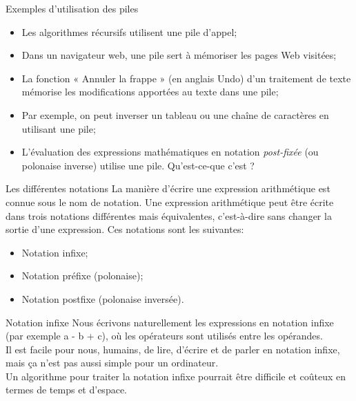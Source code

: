 \documentclass[10pt,xcolor=dvipsnames]{beamer}
\begin{document}
\begin{frame}{Exemples d'utilisation des piles}

\begin{itemize}
    \item  Les algorithmes récursifs utilisent une pile d'appel;
    \item  Dans un navigateur web, une pile sert à mémoriser les pages Web visitées;
    \item     La fonction « Annuler la frappe » (en anglais Undo) d'un traitement de texte mémorise les modifications apportées au texte dans une pile;
    \item Par exemple, on peut inverser un tableau ou une chaîne de caractères en utilisant une pile;
    \item L'évaluation des expressions mathématiques en notation \textit{post-fixée} (ou polonaise inverse) utilise une pile. \alert{Qu'est-ce-que c'est ?}
    
\end{itemize}
\end{frame}

\begin{frame}{Les différentes notations}
    La manière d'écrire une expression arithmétique est connue sous le nom de \alert{notation}. Une expression arithmétique peut être écrite dans trois notations différentes mais équivalentes, c'est-à-dire sans changer la sortie d'une expression. Ces notations sont les suivantes:

\begin{itemize}
    \item Notation infixe;
    \item Notation préfixe (polonaise);
    \item Notation postfixe (polonaise inversée).
\end{itemize}


\end{frame}

\begin{frame}{Notation infixe}
    Nous écrivons naturellement les expressions en notation \alert{infixe} (par exemple a - b + c), où les opérateurs sont utilisés entre les opérandes.\\
    Il est facile pour nous, humains, de lire, d'écrire et de parler en notation infixe, mais ça n'est pas aussi simple pour un ordinateur.\\
    Un algorithme pour traiter la notation infixe pourrait être difficile et coûteux en termes de temps et d'espace.
\end{frame}
\end{document}
